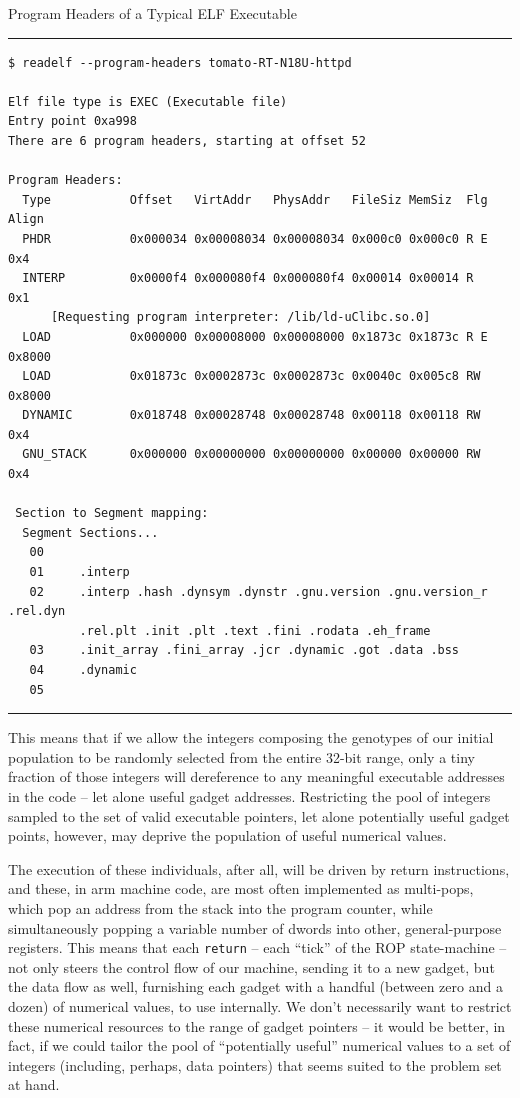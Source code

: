 \documentclass[12pt,glossary]{dalthesis}
\begin{document}
\begin{table}
\scriptsize
\caption{Program Headers of a Typical ELF Executable}
\label{tab:readelf-tomato}
\hrule
\begin{verbatim}
$ readelf --program-headers tomato-RT-N18U-httpd

Elf file type is EXEC (Executable file)
Entry point 0xa998
There are 6 program headers, starting at offset 52

Program Headers:
  Type           Offset   VirtAddr   PhysAddr   FileSiz MemSiz  Flg Align
  PHDR           0x000034 0x00008034 0x00008034 0x000c0 0x000c0 R E 0x4
  INTERP         0x0000f4 0x000080f4 0x000080f4 0x00014 0x00014 R   0x1
      [Requesting program interpreter: /lib/ld-uClibc.so.0]
  LOAD           0x000000 0x00008000 0x00008000 0x1873c 0x1873c R E 0x8000
  LOAD           0x01873c 0x0002873c 0x0002873c 0x0040c 0x005c8 RW  0x8000
  DYNAMIC        0x018748 0x00028748 0x00028748 0x00118 0x00118 RW  0x4
  GNU_STACK      0x000000 0x00000000 0x00000000 0x00000 0x00000 RW  0x4

 Section to Segment mapping:
  Segment Sections...
   00     
   01     .interp 
   02     .interp .hash .dynsym .dynstr .gnu.version .gnu.version_r .rel.dyn 
          .rel.plt .init .plt .text .fini .rodata .eh_frame 
   03     .init_array .fini_array .jcr .dynamic .got .data .bss 
   04     .dynamic 
   05     
\end{verbatim}
\hrule
\end{table}

This means that if we allow the integers composing the genotypes of our
initial population to be randomly selected from the entire 32-bit range,
only a tiny fraction of those integers will dereference to any meaningful
executable addresses in the code -- let alone useful gadget addresses.
Restricting the pool of integers sampled to the set of valid executable 
pointers, let alone potentially useful gadget points, however, may deprive
the population of useful numerical values. 

The execution of these individuals, after all, will be driven by return
instructions, and these, in \gls{arm} machine code, are most often implemented as
multi-pops, which pop an address from the stack into the program counter, while
simultaneously popping a variable number of dwords into other, general-purpose
registers. This means that each \texttt{return} -- each ``tick'' of the ROP state-machine
-- not only steers the control flow of our machine, sending it to a new gadget,
but the data flow as well, furnishing each gadget with a handful (between zero
and a dozen) of numerical values, to use internally. We don't necessarily want
to restrict these numerical resources to the range of gadget pointers -- it would
be better, in fact, if we could tailor the pool of ``potentially useful'' numerical
values to a set of integers (including, perhaps, data pointers) that seems suited
to the problem set at hand. 
\end{document}
